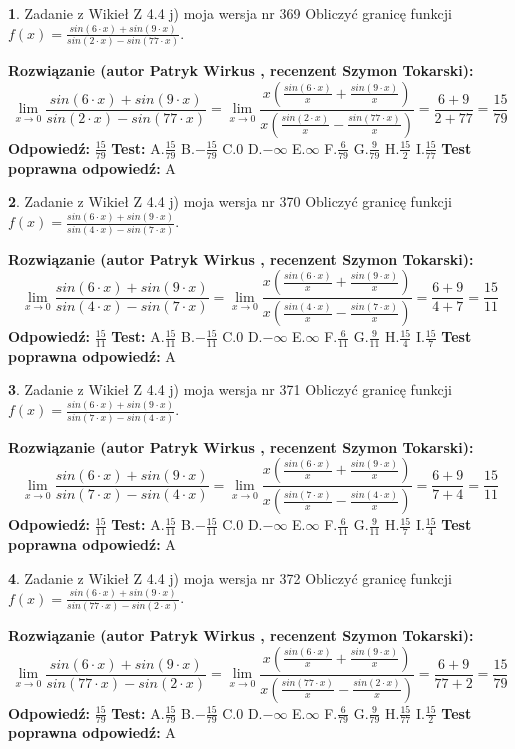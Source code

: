 \documentclass[12pt, a4paper]{article}
\theoremstyle{definition} %
\newtheorem{zad}{}
\newcommand{\zadStart}[1]{\begin{zad}#1\newline}
\newcommand{\zadStop}{\end{zad}}
\newcommand{\rozwStart}[2]{\noindent \textbf{Rozwiązanie (autor #1 , recenzent #2): }\newline}
\newcommand{\rozwStop}{\newline}
\newcommand{\odpStart}{\noindent \textbf{Odpowiedź:}\newline}
\newcommand{\odpStop}{\newline}
\newcommand{\testStart}{\noindent \textbf{Test:}\newline}
\newcommand{\testStop}{\newline}
\newcommand{\kluczStart}{\noindent \textbf{Test poprawna odpowiedź:}\newline}
\newcommand{\kluczStop}{\newline}
\begin{document}
\zadStart{Zadanie z Wikieł Z 4.4 j) moja wersja nr 369}
Obliczyć granicę funkcji $f(x)=\frac{sin(6\cdot x) +sin(9\cdot x)}{sin(2\cdot x) -sin(77\cdot x)}$.
\zadStop
\rozwStart{Patryk Wirkus}{Szymon Tokarski}
$$\lim\limits_{x\to 0}\frac{sin(6\cdot x) +sin(9\cdot x)}{sin(2\cdot x) -sin(77\cdot x)}=\lim\limits_{x\to 0}\frac{x(\frac{sin(6\cdot x)}{x}+\frac{sin(9\cdot x)}{x})}{x(\frac{sin(2\cdot x)}{x}-\frac{sin(77\cdot x)}{x})}=\frac{6+9}{2+77} = \frac{15}{79}$$
\rozwStop
\odpStart
$\frac{15}{79}$
\odpStop
\testStart
A.$\frac{15}{79}$
B.$-\frac{15}{79}$
C.$0$
D.$-\infty$
E.$\infty$
F.$\frac{6}{79}$
G.$\frac{9}{79}$
H.$\frac{15}{2}$
I.$\frac{15}{77}$
\testStop
\kluczStart
A
\kluczStop



\zadStart{Zadanie z Wikieł Z 4.4 j) moja wersja nr 370}
Obliczyć granicę funkcji $f(x)=\frac{sin(6\cdot x) +sin(9\cdot x)}{sin(4\cdot x) -sin(7\cdot x)}$.
\zadStop
\rozwStart{Patryk Wirkus}{Szymon Tokarski}
$$\lim\limits_{x\to 0}\frac{sin(6\cdot x) +sin(9\cdot x)}{sin(4\cdot x) -sin(7\cdot x)}=\lim\limits_{x\to 0}\frac{x(\frac{sin(6\cdot x)}{x}+\frac{sin(9\cdot x)}{x})}{x(\frac{sin(4\cdot x)}{x}-\frac{sin(7\cdot x)}{x})}=\frac{6+9}{4+7} = \frac{15}{11}$$
\rozwStop
\odpStart
$\frac{15}{11}$
\odpStop
\testStart
A.$\frac{15}{11}$
B.$-\frac{15}{11}$
C.$0$
D.$-\infty$
E.$\infty$
F.$\frac{6}{11}$
G.$\frac{9}{11}$
H.$\frac{15}{4}$
I.$\frac{15}{7}$
\testStop
\kluczStart
A
\kluczStop



\zadStart{Zadanie z Wikieł Z 4.4 j) moja wersja nr 371}
Obliczyć granicę funkcji $f(x)=\frac{sin(6\cdot x) +sin(9\cdot x)}{sin(7\cdot x) -sin(4\cdot x)}$.
\zadStop
\rozwStart{Patryk Wirkus}{Szymon Tokarski}
$$\lim\limits_{x\to 0}\frac{sin(6\cdot x) +sin(9\cdot x)}{sin(7\cdot x) -sin(4\cdot x)}=\lim\limits_{x\to 0}\frac{x(\frac{sin(6\cdot x)}{x}+\frac{sin(9\cdot x)}{x})}{x(\frac{sin(7\cdot x)}{x}-\frac{sin(4\cdot x)}{x})}=\frac{6+9}{7+4} = \frac{15}{11}$$
\rozwStop
\odpStart
$\frac{15}{11}$
\odpStop
\testStart
A.$\frac{15}{11}$
B.$-\frac{15}{11}$
C.$0$
D.$-\infty$
E.$\infty$
F.$\frac{6}{11}$
G.$\frac{9}{11}$
H.$\frac{15}{7}$
I.$\frac{15}{4}$
\testStop
\kluczStart
A
\kluczStop



\zadStart{Zadanie z Wikieł Z 4.4 j) moja wersja nr 372}
Obliczyć granicę funkcji $f(x)=\frac{sin(6\cdot x) +sin(9\cdot x)}{sin(77\cdot x) -sin(2\cdot x)}$.
\zadStop
\rozwStart{Patryk Wirkus}{Szymon Tokarski}
$$\lim\limits_{x\to 0}\frac{sin(6\cdot x) +sin(9\cdot x)}{sin(77\cdot x) -sin(2\cdot x)}=\lim\limits_{x\to 0}\frac{x(\frac{sin(6\cdot x)}{x}+\frac{sin(9\cdot x)}{x})}{x(\frac{sin(77\cdot x)}{x}-\frac{sin(2\cdot x)}{x})}=\frac{6+9}{77+2} = \frac{15}{79}$$
\rozwStop
\odpStart
$\frac{15}{79}$
\odpStop
\testStart
A.$\frac{15}{79}$
B.$-\frac{15}{79}$
C.$0$
D.$-\infty$
E.$\infty$
F.$\frac{6}{79}$
G.$\frac{9}{79}$
H.$\frac{15}{77}$
I.$\frac{15}{2}$
\testStop
\kluczStart
A
\kluczStop
\end{document}
